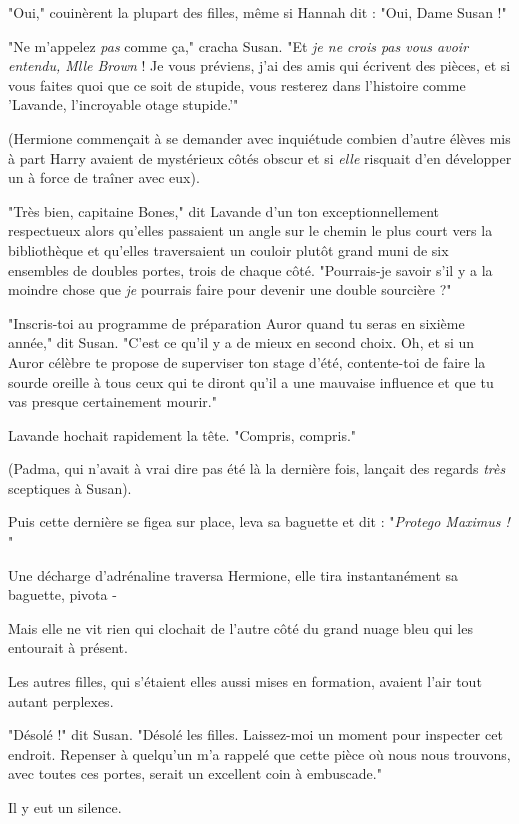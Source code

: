 "Oui," couinèrent la plupart des filles, même si Hannah dit : "Oui, Dame Susan !"

"Ne m'appelez \emph{pas}  comme ça," cracha Susan. "Et \emph{je ne crois pas vous avoir entendu, Mlle Brown}  ! Je vous préviens, j'ai des amis qui écrivent des pièces, et si vous faites quoi que ce soit de stupide, vous resterez dans l'histoire comme 'Lavande, l'incroyable otage stupide.'"

(Hermione commençait à se demander avec inquiétude combien d'autre élèves mis à part Harry avaient de mystérieux côtés obscur et si \emph{elle}  risquait d'en développer un à force de traîner avec eux).

"Très bien, capitaine Bones," dit Lavande d'un ton exceptionnellement respectueux alors qu'elles passaient un angle sur le chemin le plus court vers la bibliothèque et qu'elles traversaient un couloir plutôt grand muni de six ensembles de doubles portes, trois de chaque côté. "Pourrais-je savoir s'il y a la moindre chose que \emph{je}  pourrais faire pour devenir une double sourcière ?"

"Inscris-toi au programme de préparation Auror quand tu seras en sixième année," dit Susan. "C'est ce qu'il y a de mieux en second choix. Oh, et si un Auror célèbre te propose de superviser ton stage d'été, contente-toi de faire la sourde oreille à tous ceux qui te diront qu'il a une mauvaise influence et que tu vas presque certainement mourir."

Lavande hochait rapidement la tête. "Compris, compris."

(Padma, qui n'avait à vrai dire pas été là la dernière fois, lançait des regards \emph{très}  sceptiques à Susan).

Puis cette dernière se figea sur place, leva sa baguette et dit : "\emph{Protego Maximus !} "

Une décharge d'adrénaline traversa Hermione, elle tira instantanément sa baguette, pivota -

Mais elle ne vit rien qui clochait de l'autre côté du grand nuage bleu qui les entourait à présent.

Les autres filles, qui s'étaient elles aussi mises en formation, avaient l'air tout autant perplexes.

"Désolé !" dit Susan. "Désolé les filles. Laissez-moi un moment pour inspecter cet endroit. Repenser à quelqu'un m'a rappelé que cette pièce où nous nous trouvons, avec toutes ces portes, serait un excellent coin à embuscade."

Il y eut un silence.

